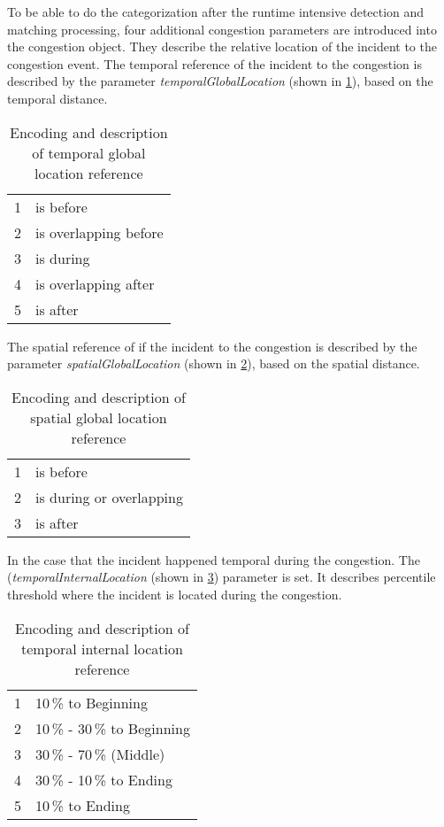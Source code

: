 To be able to do the categorization after the runtime intensive detection and matching processing, four additional congestion parameters are introduced into the congestion object. They describe the relative location of the incident to the congestion event. The temporal reference of the incident to the congestion is described by the parameter \textit{temporalGlobalLocation} (shown in \cref{tbl:jam_classification_GLT}), based on the temporal distance.
\begin{table}[ht]
	\centering
	\begin{tabular}{c|l}  
		1 & is before \\ 
 		2 & is overlapping before \\ 
 		3 & is during \\
 		4 & is overlapping after \\
 		5 & is after \\
	\end{tabular}
	\caption{Encoding and description of temporal global location reference}
	\label{tbl:jam_classification_GLT}
	\vspace{-4mm}
\end{table}
The spatial reference of if the incident to the congestion is described by the parameter \textit{spatialGlobalLocation} (shown in \cref{tbl:jam_classification_GLS}), based on the spatial distance.
\begin{table}[ht]
	\centering
	\begin{tabular}{c|l}  
		1 & is before \\ 
 		2 & is during or overlapping \\ 
 		3 & is after \\ 
	\end{tabular}
	\caption{Encoding and description of spatial global location reference}
	\label{tbl:jam_classification_GLS}
	\vspace{-4mm}
\end{table}
In the case that the incident happened temporal during the congestion. The (\textit{temporalInternalLocation} (shown in \cref{tbl:jam_classification_ILT}) parameter is set. It describes percentile threshold where the incident is located during the congestion.
\begin{table}[ht]
	\centering
	\begin{tabular}{c|l}  
		1 & 10\,\% to Beginning \\
 		2 & 10\,\% - 30\,\% to Beginning \\
 		3 & 30\,\% - 70\,\% (Middle) \\
 		4 & 30\,\% - 10\,\% to Ending \\
 		5 & 10\,\% to Ending \\
	\end{tabular}
	\caption{Encoding and description of temporal internal location reference}
	\label{tbl:jam_classification_ILT}
	\vspace{-4mm}
\end{table}
